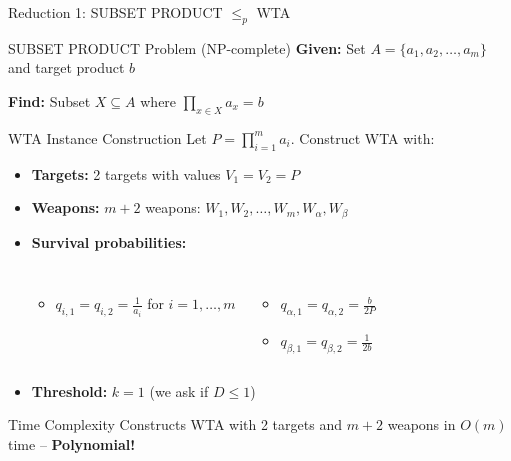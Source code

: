 \documentclass[aspectratio=43,8pt]{beamer}
\begin{document}
\begin{frame}{Reduction 1: SUBSET PRODUCT $\leq_p$ WTA}
\begin{block}{SUBSET PRODUCT Problem (NP-complete)}
\textbf{Given:} Set $A = \{a_1, a_2, \ldots, a_m\}$ and target product $b$

\textbf{Find:} Subset $X \subseteq A$ where $\prod_{x \in X} a_x = b$
\end{block}

\vspace{0.2cm}
\begin{exampleblock}{WTA Instance Construction}
Let $P = \prod_{i=1}^m a_i$. Construct WTA with:
\begin{itemize}
    \item \textbf{Targets:} 2 targets with values $V_1 = V_2 = P$
    \item \textbf{Weapons:} $m + 2$ weapons: $W_1, W_2, \ldots, W_m, W_\alpha, W_\beta$
    \item \textbf{Survival probabilities:}
    \begin{columns}
    \begin{itemize}
        \item $q_{i,1} = q_{i,2} = \frac{1}{a_i}$ for $i = 1, \ldots, m$
    \end{itemize}
    \begin{itemize}
        \item $q_{\alpha,1} = q_{\alpha,2} = \frac{b}{2P}$
        \item $q_{\beta,1} = q_{\beta,2} = \frac{1}{2b}$
    \end{itemize}
    \end{columns}
    \item \textbf{Threshold:} $k = 1$ (we ask if $D \leq 1$)
\end{itemize}
\end{exampleblock}

\begin{alertblock}{Time Complexity}
Constructs WTA with 2 targets and $m+2$ weapons in $O(m)$ time -- \textbf{Polynomial!}
\end{alertblock}
\end{frame}
\end{document}

